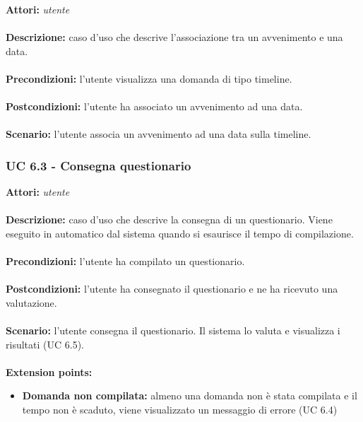 \documentclass[a4paper,11pt]{article}
\begin{document}

\textbf{Attori:} \textit{utente}
\\ \\
\textbf{Descrizione:} caso d'uso che descrive l'associazione tra un avvenimento e una data.\\
\\
\textbf{Precondizioni:} l'utente visualizza una domanda di tipo timeline.\\
\\
\textbf{Postcondizioni:} l'utente ha associato un avvenimento ad una data.\\
\\
\textbf{Scenario:} l’utente associa un avvenimento ad una data sulla timeline.\\


\subsubsection{UC 6.3 - Consegna questionario}

\textbf{Attori:} \textit{utente}
\\ \\
\textbf{Descrizione:} caso d'uso che descrive la consegna di un questionario. Viene eseguito in automatico dal sistema quando si esaurisce il tempo di compilazione.\\
\\
\textbf{Precondizioni:} l'utente ha compilato un questionario.\\
\\
\textbf{Postcondizioni:} l’utente ha consegnato il questionario e ne ha ricevuto una valutazione.\\
\\
\textbf{Scenario:} l’utente consegna il questionario. Il sistema lo valuta e visualizza i risultati (UC 6.5).\\
\\
\textbf{Extension points:} 
\begin{itemize}
	\item \textbf{Domanda non compilata:} almeno una domanda non  è stata compilata e il tempo non è scaduto, viene visualizzato un messaggio di errore (UC 6.4)
\end{itemize}


\end{document}
